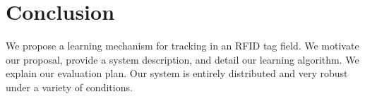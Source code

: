 \documentclass[conference]{IEEEtran}
\begin{document}
\section{Conclusion}
\label{Section: Conclusion}
We propose a learning mechanism for tracking in an RFID tag field. We motivate our proposal, provide a system description, and detail our learning algorithm. We explain our evaluation plan. Our system is entirely distributed and very robust under a variety of conditions.


%
%



%
%
\end{document}
